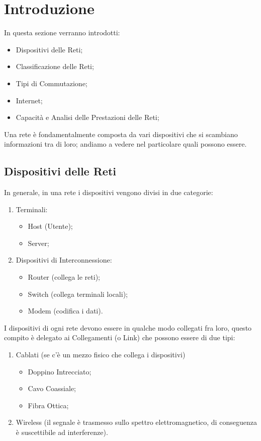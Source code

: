 \documentclass[a4paper]{article}
\begin{document}
\newpage


\section{Introduzione}

	In questa sezione verranno introdotti:
	\begin{itemize}
	\item Dispositivi delle Reti;
	\item Classificazione delle Reti;
	\item Tipi di Commutazione;
	\item Internet;
	\item Capacità e Analisi delle Prestazioni delle Reti;
	\end{itemize}	
	
	Una rete è fondamentalmente composta da vari dispositivi che si scambiano informazioni tra di loro; andiamo a vedere nel particolare quali possono 			essere.
	
	\subsection{Dispositivi delle Reti}
	
		In generale, in una rete i dispositivi vengono divisi in due categorie:
		\begin{enumerate}
			\item Terminali:
				\begin{itemize}
					\item Host (Utente);
					\item Server;
				\end{itemize}
			\item Dispositivi di Interconnessione:
				\begin{itemize}
					\item Router (collega le reti);
					\item Switch (collega terminali locali);
					\item Modem (codifica i dati).
				\end{itemize}
		\end{enumerate}
		
		I dispositivi di ogni rete devono essere in qualche modo collegati fra loro, questo compito è delegato ai Collegamenti (o Link) che possono essere di due tipi:
		\begin{enumerate}
			\item Cablati (se c'è un mezzo fisico che collega i dispositivi)
				\begin{itemize}
					\item Doppino Intrecciato;
					\item Cavo Coassiale;
					\item Fibra Ottica;
				\end{itemize}
			\item Wireless (il segnale è trasmesso sullo spettro elettromagnetico, di conseguenza è suscettibile ad interferenze).
		\end{enumerate}
	
\end{document}

